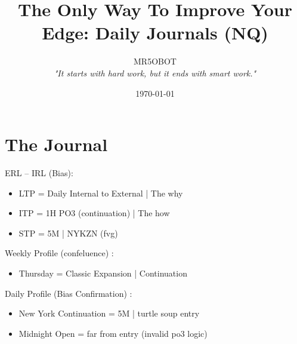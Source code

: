 \documentclass{article}
\title{The Only Way To Improve Your Edge: Daily Journals (NQ)}
\author{MR5OBOT \\ \textit{"It starts with hard work, but it ends with smart work."}}
\date{\today}
\begin{document}
\maketitle
\pagestyle{fancy}
\noindent\hdashrule[0.2ex]{\linewidth}{0.2pt}{1mm} 


\section{The Journal} 
\vspace{0.3cm}

\begin{enumerate}
\begin{notebox}
  \item ERL -- IRL (Bias): 
\end{notebox}

\begin{itemize} 
  \item LTP = \hspace{0.3pt} Daily Internal to External | The why \vspace{0.2cm}
  \item ITP = \hspace{0.3pt} 1H PO3 (continuation) | The how \vspace{0.2cm}
  \item STP = \hspace{0.3pt} 5M | NYKZN (fvg) \vspace{0.2cm}
\end{itemize}

\begin{notebox}
    \item Weekly Profile (confeluence)  : 
\end{notebox}

\begin{itemize} 
  \item Thursday  = \hspace{0.3pt} Classic Expansion | Continuation
\end{itemize}

\vspace{0.3cm}
\begin{notebox}
    \item Daily Profile (Bias Confirmation)  : 
\end{notebox}

\begin{itemize} 
  \item New York Continuation = \hspace{0.3pt} 5M |  turtle soup entry
  \item Midnight Open = \hspace{0.3pt} far from entry (invalid po3 logic)

\end{itemize}
\end{enumerate}
\end{document}

